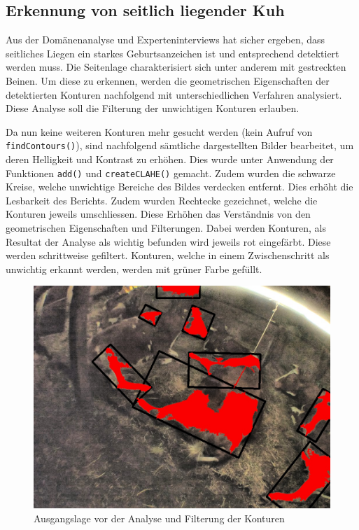 \subsection{Erkennung von seitlich liegender Kuh}
Aus der Domänenanalyse und Experteninterviews hat sicher ergeben, dass seitliches Liegen ein starkes Geburtsanzeichen ist und entsprechend detektiert werden muss. Die Seitenlage charakterisiert sich unter anderem mit gestreckten Beinen. Um diese zu erkennen, werden die geometrischen Eigenschaften der detektierten Konturen nachfolgend mit unterschiedlichen Verfahren analysiert. Diese Analyse soll die Filterung der unwichtigen Konturen erlauben. 

 Da nun keine weiteren Konturen mehr gesucht werden (kein Aufruf von \texttt{findContours()}), sind nachfolgend sämtliche dargestellten Bilder bearbeitet, um deren Helligkeit und Kontrast zu erhöhen. Dies wurde unter Anwendung der Funktionen \texttt{add()} und \texttt{createCLAHE()} gemacht. Zudem wurden die schwarze Kreise, welche unwichtige Bereiche des Bildes verdecken entfernt. Dies erhöht die Lesbarkeit des Berichts. Zudem wurden Rechtecke gezeichnet, welche die Konturen jeweils umschliessen. Diese Erhöhen das Verständnis von den geometrischen Eigenschaften und Filterungen. Dabei werden Konturen, als Resultat der Analyse als wichtig befunden wird jeweils rot eingefärbt. Diese werden schrittweise gefiltert. Konturen, welche in einem Zwischenschritt als unwichtig erkannt werden, werden mit grüner Farbe gefüllt. 

\begin{figure}[H]
	\center
	\includegraphics[scale=.43]{Grafiken/entwicklung/20StartImage.jpg}
	\caption{Ausgangslage vor der Analyse und Filterung der Konturen} 
	\label{fig: Ausgangslage vor der Analyse und Filterung der Konturen} 
\end{figure}

